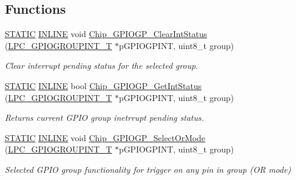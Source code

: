 \subsection*{Functions}
\begin{DoxyCompactItemize}
\item 
\hyperlink{group___l_p_c___types___public___macros_ga10b2d890d871e1489bb02b7e70d9bdfb}{S\+T\+A\+T\+IC} \hyperlink{spifi__18xx__43xx_8h_a2eb6f9e0395b47b8d5e3eeae4fe0c116}{I\+N\+L\+I\+NE} void \hyperlink{group___g_p_i_o_g_p__18_x_x__43_x_x_gacb2b28673be061951f30cac631015be1}{Chip\+\_\+\+G\+P\+I\+O\+G\+P\+\_\+\+Clear\+Int\+Status} (\hyperlink{struct_l_p_c___g_p_i_o_g_r_o_u_p_i_n_t___t}{L\+P\+C\+\_\+\+G\+P\+I\+O\+G\+R\+O\+U\+P\+I\+N\+T\+\_\+T} $\ast$p\+G\+P\+I\+O\+G\+P\+I\+NT, uint8\+\_\+t group)
\begin{DoxyCompactList}\small\item\em Clear interrupt pending status for the selected group. \end{DoxyCompactList}\item 
\hyperlink{group___l_p_c___types___public___macros_ga10b2d890d871e1489bb02b7e70d9bdfb}{S\+T\+A\+T\+IC} \hyperlink{spifi__18xx__43xx_8h_a2eb6f9e0395b47b8d5e3eeae4fe0c116}{I\+N\+L\+I\+NE} bool \hyperlink{group___g_p_i_o_g_p__18_x_x__43_x_x_ga1f34e79048a85055093d15d67294a86f}{Chip\+\_\+\+G\+P\+I\+O\+G\+P\+\_\+\+Get\+Int\+Status} (\hyperlink{struct_l_p_c___g_p_i_o_g_r_o_u_p_i_n_t___t}{L\+P\+C\+\_\+\+G\+P\+I\+O\+G\+R\+O\+U\+P\+I\+N\+T\+\_\+T} $\ast$p\+G\+P\+I\+O\+G\+P\+I\+NT, uint8\+\_\+t group)
\begin{DoxyCompactList}\small\item\em Returns current G\+P\+IO group inetrrupt pending status. \end{DoxyCompactList}\item 
\hyperlink{group___l_p_c___types___public___macros_ga10b2d890d871e1489bb02b7e70d9bdfb}{S\+T\+A\+T\+IC} \hyperlink{spifi__18xx__43xx_8h_a2eb6f9e0395b47b8d5e3eeae4fe0c116}{I\+N\+L\+I\+NE} void \hyperlink{group___g_p_i_o_g_p__18_x_x__43_x_x_ga11ad479a890f736ae3479e69d8381d16}{Chip\+\_\+\+G\+P\+I\+O\+G\+P\+\_\+\+Select\+Or\+Mode} (\hyperlink{struct_l_p_c___g_p_i_o_g_r_o_u_p_i_n_t___t}{L\+P\+C\+\_\+\+G\+P\+I\+O\+G\+R\+O\+U\+P\+I\+N\+T\+\_\+T} $\ast$p\+G\+P\+I\+O\+G\+P\+I\+NT, uint8\+\_\+t group)
\begin{DoxyCompactList}\small\item\em Selected G\+P\+IO group functionality for trigger on any pin in group (OR mode) \end{DoxyCompactList}\item 

\end{DoxyCompactItemize}
